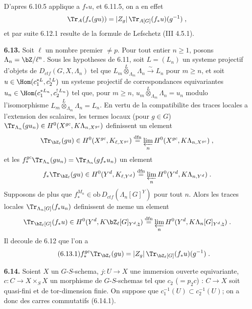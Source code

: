 D'apres 6.10.5 applique a $f_* u$, et 6.11.5, on a en effet
\[
\Tr_A(f_*(gu)) = |Z_g|\,\Tr_{A[G]}(f_* u)(g^{-1})\;,
\]
et par suite 6.12.1 resulte de la formule de Lefschetz (III 4.5.1).

\medskip
\noindent\textbf{6.13.} Soit $\ell$ un nombre premier $\not= p$. Pour tout entier $n \geq 1$, posons $\Lambda_n = \bZ/\ell^n$. Sous les hypotheses de 6.11, soit $L = (L_n)$ un systeme projectif d'objets de $D_{ctf}(G,X,\Lambda_n)$ tel que $L_m \overset{L}{\otimes}_{\Lambda_m} \Lambda_n \xrightarrow{\sim} L_n$ pour $m \geq n$, et soit $u \in \Hom(c_1^{*L}, c_2^{!\,L})$ un systeme projectif de correspondances equivariantes $u_n \in \Hom(c_1^{*L_n}, c_2^{!\,L_n})$ tel que, pour $m \geq n$, $u_m \overset{L}{\otimes}_{\Lambda_m} \Lambda_n = u_n$ modulo l'isomorphisme $L_m \overset{L}{\otimes}_{\Lambda_m} \Lambda_n = L_n$. En vertu de la compatibilite des traces locales a l'extension des scalaires, les termes locaux (pour $g \in G$) $\Tr_{\Lambda_n}(gu_n) \in H^0(X^{gc}, K\Lambda_{n,X^{gc}})$ definissent un element
\[
\Tr_{\bZ_\ell}(gu) \in H^0(X^{gc}, K_{\ell,X^{gc}}) \overset{\mathrm{dfn}}{=} \varprojlim_n H^0(X^{gc}, K\Lambda_{n,X^{gc}})\;,
\]
et les $f_*^{gc}\Tr_{\Lambda_n}(gu_n) = \Tr_{\Lambda_n}(gf_* u_n)$ un element
\[
f_*\Tr_{\bZ_\ell}(gu) \in H^0(Y^d, K_{\ell,Y^d}) \overset{\mathrm{dfn}}{=} \varprojlim_n H^0(Y^d, K\Lambda_{n,Y^d})\;.
\]
Supposons de plus que $f_*^{M_n} \in \mathrm{ob}\, D_{ctf}(\Lambda_n[G]^Y)$ pour tout $n$. Alors les traces locales $\Tr_{\Lambda_n[G]}(f_* u_n)$ definissent de meme un element
\[
\Tr_{\bZ_\ell[G]}(f_* u) \in H^0(Y^d, K\bZ_\ell[G]_{Y^d,\natural}) \overset{\mathrm{dfn}}{=} \varprojlim_n H^0(Y^d, K\Lambda_n[G]_{Y^d,\natural})\;.
\]
Il decoule de 6.12 que l'on a
\begin{equation}\tag{6.13.1}
f_*^{gc}\Tr_{\bZ_\ell}(gu) = |Z_g|\,\Tr_{\bZ_\ell[G]}(f_* u)(g^{-1})\;.
\end{equation}

\medskip
\noindent\textbf{6.14.} Soient $X$ un $G$-$S$-schema, $j : U \longrightarrow X$ une immersion ouverte equivariante, $c : C \longrightarrow X \times_S X$ un morphisme de $G$-$S$-schemas tel que $c_2$ ($= p_2c$) : $C \longrightarrow X$ soit quasi-fini et de tor-dimension finie. On suppose que $c_1^{-1}(U) \subset c_2^{-1}(U)$; on a donc des carres commutatifs (6.14.1).

